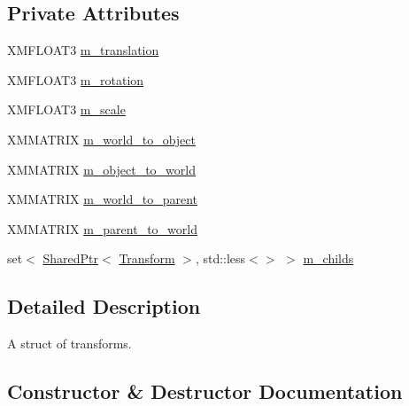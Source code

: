 \subsection*{Private Attributes}
\begin{DoxyCompactItemize}
\item 
X\+M\+F\+L\+O\+A\+T3 \hyperlink{structmage_1_1_transform_a57e27b28e0cf85be034055a68513ad79}{m\+\_\+translation}
\item 
X\+M\+F\+L\+O\+A\+T3 \hyperlink{structmage_1_1_transform_a037b4fb338bfe79aa2ab1a2e809c40df}{m\+\_\+rotation}
\item 
X\+M\+F\+L\+O\+A\+T3 \hyperlink{structmage_1_1_transform_a25d15c85b93037bab5b755c86bef0b54}{m\+\_\+scale}
\item 
X\+M\+M\+A\+T\+R\+IX \hyperlink{structmage_1_1_transform_a873fefd93a3c1ca938e2bbecdbc5b3ac}{m\+\_\+world\+\_\+to\+\_\+object}
\item 
X\+M\+M\+A\+T\+R\+IX \hyperlink{structmage_1_1_transform_a4e227321c984ddf2ece92d7954ae5db9}{m\+\_\+object\+\_\+to\+\_\+world}
\item 
X\+M\+M\+A\+T\+R\+IX \hyperlink{structmage_1_1_transform_a1a98dc6d2852ad1a884327ad3581eb52}{m\+\_\+world\+\_\+to\+\_\+parent}
\item 
X\+M\+M\+A\+T\+R\+IX \hyperlink{structmage_1_1_transform_af8b746deb2f7128d143063f3e11bc038}{m\+\_\+parent\+\_\+to\+\_\+world}
\item 
set$<$ \hyperlink{namespacemage_a1e01ae66713838a7a67d30e44c67703e}{Shared\+Ptr}$<$ \hyperlink{structmage_1_1_transform}{Transform} $>$, std\+::less$<$$>$ $>$ \hyperlink{structmage_1_1_transform_a7c90722d5728cfcaf11f3d62b9ced11e}{m\+\_\+childs}
\end{DoxyCompactItemize}


\subsection{Detailed Description}
A struct of transforms. 

\subsection{Constructor \& Destructor Documentation}
\hypertarget{structmage_1_1_transform_a3d324dc935e11ee5e82957d58553fd7d}{}\label{structmage_1_1_transform_a3d324dc935e11ee5e82957d58553fd7d} 
